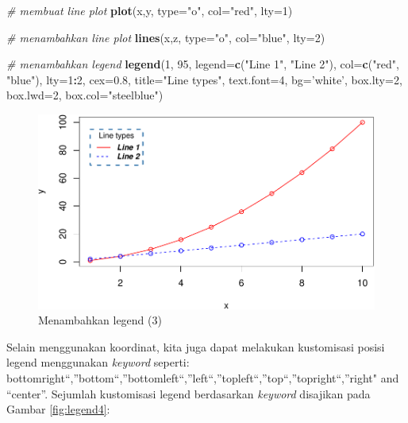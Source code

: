 \documentclass[]{book}
\newenvironment{Shaded}{\begin{snugshade}}{\end{snugshade}}
\newcommand{\KeywordTok}[1]{\textcolor[rgb]{0.13,0.29,0.53}{\textbf{#1}}}
\newcommand{\DataTypeTok}[1]{\textcolor[rgb]{0.13,0.29,0.53}{#1}}
\newcommand{\DecValTok}[1]{\textcolor[rgb]{0.00,0.00,0.81}{#1}}
\newcommand{\FloatTok}[1]{\textcolor[rgb]{0.00,0.00,0.81}{#1}}
\newcommand{\StringTok}[1]{\textcolor[rgb]{0.31,0.60,0.02}{#1}}
\newcommand{\CommentTok}[1]{\textcolor[rgb]{0.56,0.35,0.01}{\textit{#1}}}
\newcommand{\OperatorTok}[1]{\textcolor[rgb]{0.81,0.36,0.00}{\textbf{#1}}}
\newcommand{\NormalTok}[1]{#1}
\begin{document}
\begin{Shaded}
\begin{Highlighting}[]
\CommentTok{# membuat line plot}
\KeywordTok{plot}\NormalTok{(x,y, }\DataTypeTok{type=}\StringTok{"o"}\NormalTok{, }\DataTypeTok{col=}\StringTok{"red"}\NormalTok{, }\DataTypeTok{lty=}\DecValTok{1}\NormalTok{)}

\CommentTok{# menambahkan line plot}
\KeywordTok{lines}\NormalTok{(x,z, }\DataTypeTok{type=}\StringTok{"o"}\NormalTok{, }\DataTypeTok{col=}\StringTok{"blue"}\NormalTok{, }\DataTypeTok{lty=}\DecValTok{2}\NormalTok{)}

\CommentTok{# menambahkan legend}
\KeywordTok{legend}\NormalTok{(}\DecValTok{1}\NormalTok{, }\DecValTok{95}\NormalTok{, }\DataTypeTok{legend=}\KeywordTok{c}\NormalTok{(}\StringTok{"Line 1"}\NormalTok{, }\StringTok{"Line 2"}\NormalTok{),}
       \DataTypeTok{col=}\KeywordTok{c}\NormalTok{(}\StringTok{"red"}\NormalTok{, }\StringTok{"blue"}\NormalTok{), }\DataTypeTok{lty=}\DecValTok{1}\OperatorTok{:}\DecValTok{2}\NormalTok{, }\DataTypeTok{cex=}\FloatTok{0.8}\NormalTok{,}
       \DataTypeTok{title=}\StringTok{"Line types"}\NormalTok{, }\DataTypeTok{text.font=}\DecValTok{4}\NormalTok{, }\DataTypeTok{bg=}\StringTok{'white'}\NormalTok{,}
       \DataTypeTok{box.lty=}\DecValTok{2}\NormalTok{, }\DataTypeTok{box.lwd=}\DecValTok{2}\NormalTok{, }\DataTypeTok{box.col=}\StringTok{"steelblue"}\NormalTok{)}
\end{Highlighting}
\end{Shaded}

\begin{figure}

{\centering \includegraphics[width=0.7\linewidth]{EnvStat_files/figure-latex/legend3-1} 

}

\caption{Menambahkan legend (3)}\label{fig:legend3}
\end{figure}

Selain menggunakan koordinat, kita juga dapat melakukan kustomisasi
posisi legend menggunakan \emph{keyword} seperti:
bottomright``,''bottom``,''bottomleft``,''left``,''topleft``,''top``,''topright``,''right"
and ``center''. Sejumlah kustomisasi legend berdasarkan \emph{keyword}
disajikan pada Gambar \ref{fig:legend4}:
\end{document}
